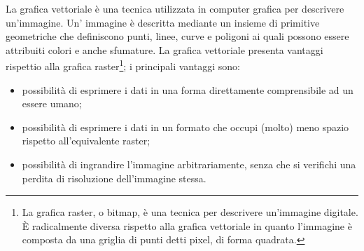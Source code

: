 La grafica vettoriale \`e una tecnica utilizzata in computer grafica per descrivere 
un'immagine. 
Un' immagine \`e descritta mediante un insieme di primitive geometriche che definiscono punti, linee, curve e poligoni ai quali possono essere attribuiti colori e anche sfumature. La grafica vettoriale presenta  vantaggi rispettio alla grafica raster\footnote{La grafica raster, o bitmap, \`e una tecnica per descrivere un'immagine digitale. \`E radicalmente diversa rispetto alla grafica vettoriale in quanto l’immagine \`e composta da una griglia di punti detti pixel, di forma quadrata.}; i principali vantaggi sono:
\begin{itemize}
\item possibilit\`a di esprimere i dati in una forma direttamente comprensibile ad un essere umano;
\item possibilit\`a di esprimere i dati in un formato che occupi (molto) meno spazio rispetto all'equivalente raster;
\item possibilit\`a di ingrandire l'immagine arbitrariamente, senza che si verifichi una perdita di risoluzione dell'immagine stessa.
\end{itemize}